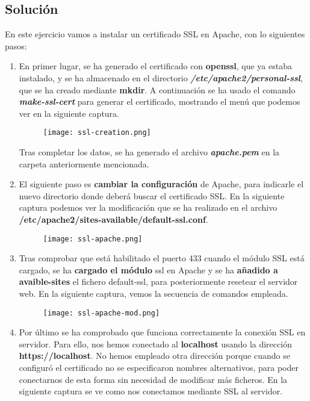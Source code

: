 \subsection{Solución}
En este ejercicio vamos a instalar un certificado SSL en Apache, con lo siguientes pasos:

\begin{enumerate}
    \item En primer lugar, se ha generado el certificado con \textbf{openssl}, que ya estaba instalado, y se ha almacenado en el directorio \textbf{\textit{/etc/apache2/personal-ssl}}, que se ha creado mediante \textbf{mkdir}. A continuación se ha usado el comando \textbf{\textit{make-ssl-cert}} para generar el certificado, mostrando el menú que podemos ver en la siguiente captura.

    \begin{figure}[H]
        \centering
        \texttt{[image: ssl-creation.png]}
    \end{figure}

    Tras completar los datos, se ha generado el archivo \textbf{\textit{apache.pem}} en la carpeta anteriormente mencionada.

    \item El siguiente paso es \textbf{cambiar la configuración} de Apache, para indicarle el nuevo directorio donde deberá buscar el certificado SSL. En la siguiente captura podemos ver la modificación que se ha realizado en el archivo \textbf{/etc/apache2/sites-available/default-ssl.conf}.

    \begin{figure}[H]
        \centering
        \texttt{[image: ssl-apache.png]}
    \end{figure}

    \item Tras comprobar que está habilitado el puerto 433 cuando el módulo SSL está cargado, se ha \textbf{cargado el módulo} ssl en Apache y se ha \textbf{añadido a avaible-sites} el fichero default-ssl, para posteriormente resetear el servidor web. En la siguiente captura, vemos la secuencia de comandos empleada.

        \begin{figure}[H]
        \centering
        \texttt{[image: ssl-apache-mod.png]}
    \end{figure}

    \item Por último se ha comprobado que funciona correctamente la conexión SSL en servidor. Para ello, nos hemos conectado al \textbf{localhost} usando la dirección \textbf{https://localhost}. No hemos empleado otra dirección porque cuando se configuró el certificado no se especificaron nombres alternativos, para poder conectarnos de esta forma sin necesidad de modificar más ficheros. En la siguiente captura se ve como nos conectamos mediante SSL al servidor.


\end{enumerate}
